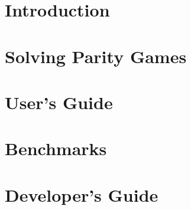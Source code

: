 \documentclass[open=left,twopage=true]{scrreprt}
\begin{document}
\cleardoublepage
{}
\tableofcontents

\chapter{Introduction}



\chapter{Solving Parity Games}
\label{chp:pgames}









\chapter{User's Guide}
\label{chp:uguide}









\chapter{Benchmarks}
\label{chp:benchmarks}


%

\chapter{Developer's Guide}
\label{chp:dguide}







\cleardoublepage
{}


\end{document}
